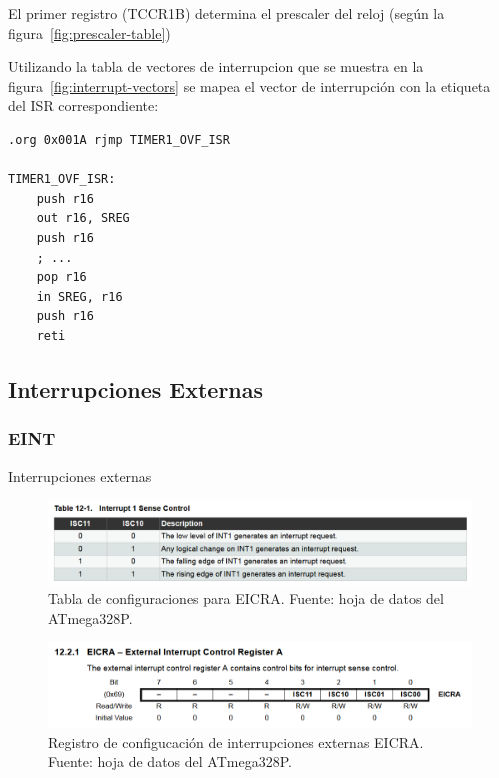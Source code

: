 El primer registro (TCCR1B) determina el prescaler del reloj (según la figura\ \ref{fig:prescaler-table})

Utilizando la tabla de vectores de interrupcion que se muestra en la figura\ \ref{fig:interrupt-vectors} se mapea el vector de interrupción con la etiqueta del ISR correspondiente:

\begin{verbatim}
.org 0x001A rjmp TIMER1_OVF_ISR

TIMER1_OVF_ISR:
    push r16
    out r16, SREG
    push r16
    ; ... 
    pop r16
    in SREG, r16
    push r16
    reti
\end{verbatim}

\subsection{Interrupciones Externas}
   \subsubsection{EINT}
    Interrupciones externas 

    \begin{figure}[H]
    \centering
    \includegraphics[width=\linewidth]{./Anexos/Marco Teorico/External Interrupts/EICRA table.png}
    \caption{Tabla de configuraciones para EICRA. Fuente: hoja de datos del ATmega328P\@\cite{atmega328p_datasheet}.}
    \label{fig:EICRA-table}
    \end{figure}

    \begin{figure}[H]
    \centering
    \includegraphics[width=\linewidth]{./Anexos/Marco Teorico/External Interrupts/EICRA.png}
    \caption{Registro de configucación de interrupciones externas EICRA. Fuente: hoja de datos del ATmega328P\@\cite{atmega328p_datasheet}.}
    \label{fig:EICRA}
    \end{figure}

